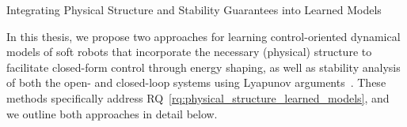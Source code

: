 \begin{contribution}\label{contrib:learned_models}
    Integrating Physical Structure and Stability Guarantees into Learned Models
\end{contribution}
In this thesis, we propose two approaches for learning control-oriented dynamical models of soft robots that incorporate the necessary (physical) structure to facilitate closed-form control through energy shaping, as well as stability analysis of both the open- and closed-loop systems using Lyapunov arguments~\cite{khalil2002nonlinear}. These methods specifically address \gls{RQ}~\ref{rq:physical_structure_learned_models}, and we outline both approaches in detail below.

